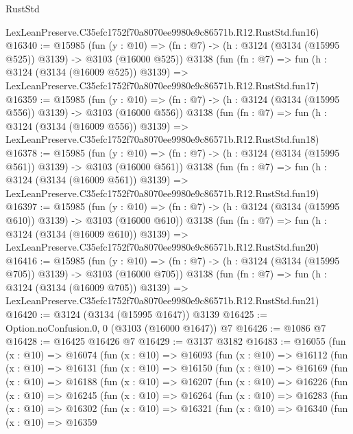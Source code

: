 \begin{lexlean}{RustStd}
\begin{coremodule}
    LexLeanPreserve.C35efc1752f70a8070ee9980e9c86571b.R12.RustStd.fun16)
@16340 := @15985
    (fun (y : @10) => (fn : @7) -> (h : @3124 (@3134 (@15995 @525)) @3139) -> @3103 (@16000 @525))
    @3138
    (fun (fn : @7) =>
    fun (h : @3124 (@3134 (@16009 @525)) @3139) =>
    LexLeanPreserve.C35efc1752f70a8070ee9980e9c86571b.R12.RustStd.fun17)
@16359 := @15985
    (fun (y : @10) => (fn : @7) -> (h : @3124 (@3134 (@15995 @556)) @3139) -> @3103 (@16000 @556))
    @3138
    (fun (fn : @7) =>
    fun (h : @3124 (@3134 (@16009 @556)) @3139) =>
    LexLeanPreserve.C35efc1752f70a8070ee9980e9c86571b.R12.RustStd.fun18)
@16378 := @15985
    (fun (y : @10) => (fn : @7) -> (h : @3124 (@3134 (@15995 @561)) @3139) -> @3103 (@16000 @561))
    @3138
    (fun (fn : @7) =>
    fun (h : @3124 (@3134 (@16009 @561)) @3139) =>
    LexLeanPreserve.C35efc1752f70a8070ee9980e9c86571b.R12.RustStd.fun19)
@16397 := @15985
    (fun (y : @10) => (fn : @7) -> (h : @3124 (@3134 (@15995 @610)) @3139) -> @3103 (@16000 @610))
    @3138
    (fun (fn : @7) =>
    fun (h : @3124 (@3134 (@16009 @610)) @3139) =>
    LexLeanPreserve.C35efc1752f70a8070ee9980e9c86571b.R12.RustStd.fun20)
@16416 := @15985
    (fun (y : @10) => (fn : @7) -> (h : @3124 (@3134 (@15995 @705)) @3139) -> @3103 (@16000 @705))
    @3138
    (fun (fn : @7) =>
    fun (h : @3124 (@3134 (@16009 @705)) @3139) =>
    LexLeanPreserve.C35efc1752f70a8070ee9980e9c86571b.R12.RustStd.fun21)
@16420 := @3124 (@3134 (@15995 @1647)) @3139
@16425 := Option.noConfusion.{0, 0} (@3103 (@16000 @1647)) @7
@16426 := @1086 @7
@16428 := @16425 @16426 @7
@16429 := @3137 @3182
@16483 := @16055
    (fun (x : @10) =>
    @16074
      (fun (x : @10) =>
      @16093
        (fun (x : @10) =>
        @16112
          (fun (x : @10) =>
          @16131
            (fun (x : @10) =>
            @16150
              (fun (x : @10) =>
              @16169
                (fun (x : @10) =>
                @16188
                  (fun (x : @10) =>
                  @16207
                    (fun (x : @10) =>
                    @16226
                      (fun (x : @10) =>
                      @16245
                        (fun (x : @10) =>
                        @16264
                          (fun (x : @10) =>
                          @16283
                            (fun (x : @10) =>
                            @16302
                              (fun (x : @10) =>
                              @16321
                                (fun (x : @10) =>
                                @16340
                                  (fun (x : @10) =>
                                  @16359

\end{coremodule}
\end{lexlean}
